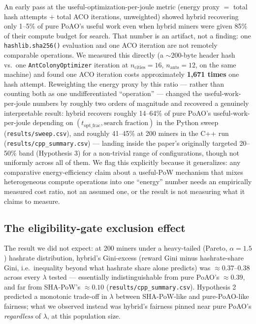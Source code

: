 \documentclass[journal]{IEEEtran}
\begin{document}
An early pass at the useful-optimization-per-joule metric (energy proxy
$=$ total hash attempts $+$ total ACO iterations, unweighted) showed hybrid
recovering only 1--5\% of pure PoAO's useful work even when hybrid miners
were given 85\% of their compute budget for search. That number is an
artifact, not a finding: one \texttt{hashlib.sha256()} evaluation and one
ACO iteration are not remotely comparable operations. We measured this
directly (a $\sim$200-byte header hash vs.\ one \texttt{AntColonyOptimizer}
iteration at $n_{\text{cities}}=16$, $n_{\text{ants}}=12$, on the same
machine) and found one ACO iteration costs approximately \textbf{1{,}671
times} one hash attempt. Reweighting the energy proxy by this ratio ---
rather than counting both as one undifferentiated ``operation'' --- changed
the useful-work-per-joule numbers by roughly two orders of magnitude and
recovered a genuinely interpretable result: hybrid recovers roughly
14--64\% of pure PoAO's useful-work-per-joule depending on
$(t_{\text{opt\_frac}}, \text{search fraction})$ in the Python sweep
(\texttt{results/sweep.csv}), and roughly 41--45\% at 200 miners in the C++
run (\texttt{results/cpp\_summary.csv}) --- landing inside the paper's
originally targeted 20--50\% band (Hypothesis 3) for a non-trivial range of
configurations, though not uniformly across all of them. We flag this
explicitly because it generalizes: any comparative energy-efficiency claim
about a useful-PoW mechanism that mixes heterogeneous compute operations
into one ``energy'' number needs an empirically measured cost ratio, not an
assumed one, or the result is not measuring what it claims to measure.

\subsection{The eligibility-gate exclusion effect}
\label{sec:eligibility-gate}

The result we did not expect: at 200 miners under a heavy-tailed
(Pareto, $\alpha=1.5$) hashrate distribution, hybrid's Gini-excess (reward
Gini minus hashrate-share Gini, i.e.\ inequality beyond what hashrate share
alone predicts) was $\approx 0.37$--$0.38$ across every $\lambda$ tested ---
essentially indistinguishable from pure PoAO's $\approx 0.39$, and far from
SHA-PoW's $\approx 0.10$ (\texttt{results/cpp\_summary.csv}). Hypothesis 2
predicted a monotonic trade-off in $\lambda$ between SHA-PoW-like and
pure-PoAO-like fairness; what we observed instead was hybrid's fairness
pinned near pure PoAO's \emph{regardless} of $\lambda$, at this population
size.
\end{document}
